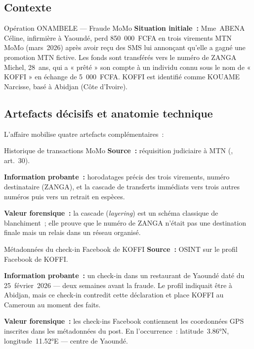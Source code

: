 \subsection{Contexte}

\begin{boxscenario}{Opération ONAMBELE --- Fraude MoMo}
\textbf{Situation initiale~:} Mme~ABENA Céline, infirmière à Yaoundé,
perd 850~000~FCFA en trois virements MTN MoMo (mars~2026) après avoir reçu
des SMS lui annonçant qu'elle a gagné une promotion MTN fictive. Les fonds
sont transférés vers le numéro de ZANGA Michel, 28~ans, qui a « prêté » son
compte à un individu connu sous le nom de « KOFFI » en échange de
5~000~FCFA. KOFFI est identifié comme KOUAME Narcisse, basé à Abidjan
(Côte d'Ivoire).
\end{boxscenario}

\subsection{Artefacts décisifs et anatomie technique}

L'affaire mobilise quatre artefacts complémentaires~:

\begin{boxartefact}{Historique de transactions MoMo}
\textbf{Source~:} réquisition judiciaire à MTN (, art.~30).

\textbf{Information probante~:} horodatages précis des trois virements,
numéro destinataire (ZANGA), et la cascade de transferts immédiats vers
trois autres numéros puis vers un retrait en espèces.

\textbf{Valeur forensique~:} la cascade (\textit{layering}) est un
schéma classique de blanchiment~; elle prouve que le numéro de ZANGA
n'était pas une destination finale mais un relais dans un réseau organisé.
\end{boxartefact}

\begin{boxartefact}{Métadonnées du check-in Facebook de KOFFI}
\textbf{Source~:} OSINT sur le profil Facebook de KOFFI.

\textbf{Information probante~:} un check-in dans un restaurant de Yaoundé
daté du 25~février~2026 --- deux semaines avant la fraude. Le profil indiquait
être à Abidjan, mais ce check-in contredit cette déclaration et place KOFFI
au Cameroun au moment des faits.

\textbf{Valeur forensique~:} les check-ins Facebook contiennent les
coordonnées GPS inscrites dans les métadonnées du post. En l'occurrence~:
latitude~3.86°N, longitude~11.52°E --- centre de Yaoundé.
\end{boxartefact}

